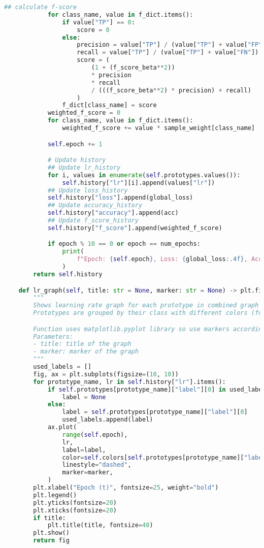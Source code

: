 \begin{lstlisting}[language=Python]
            ## calculate f-score
            for class_name, value in f_dict.items():
                if value["TP"] == 0:
                    score = 0
                else:
                    precision = value["TP"] / (value["TP"] + value["FP"])
                    recall = value["TP"] / (value["TP"] + value["FN"])
                    score = (
                        (1 + (f_score_beta**2))
                        * precision
                        * recall
                        / (((f_score_beta**2) * precision) + recall)
                    )
                f_dict[class_name] = score
            weighted_f_score = 0
            for class_name, value in f_dict.items():
                weighted_f_score += value * sample_weight[class_name]

            self.epoch += 1

            # Update history
            ## Update lr_history
            for i, values in enumerate(self.prototypes.values()):
                self.history["lr"][i].append(values["lr"])
            ## Update loss_history
            self.history["loss"].append(global_loss)
            ## Update accuracy_history
            self.history["accuracy"].append(acc)
            ## Update f_score_history
            self.history["f_score"].append(weighted_f_score)

            if epoch % 10 == 0 or epoch == num_epochs:
                print(
                    f"Epoch: {self.epoch}, Loss: {global_loss:.4f}, Accuracy: {acc*100:.2f} %, F_{f_name}_score: {weighted_f_score*100:.2f} %"
                )
        return self.history

    def lr_graph(self, title: str = None, marker: str = None) -> plt.figure:
        """
        Shows learning rate graph for each prototype in combined graph
        Prototypes are grouped by their class with different colors (for now max 3 colors)

        Function uses matplotlib.pyplot library so use markers according to matplotlib.pyplot library
        Parameters:
        - title: title of the graph
        - marker: marker of the graph
        """
        used_labels = []
        fig, ax = plt.subplots(figsize=(10, 10))
        for prototype_name, lr in self.history["lr"].items():
            if self.prototypes[prototype_name]["label"][0] in used_labels:
                label = None
            else:
                label = self.prototypes[prototype_name]["label"][0]
                used_labels.append(label)
            ax.plot(
                range(self.epoch),
                lr,
                label=label,
                color=self.colors[self.prototypes[prototype_name]["label"][0]],
                linestyle="dashed",
                marker=marker,
            )
        plt.xlabel("Epoch (t)", fontsize=25, weight="bold")
        plt.legend()
        plt.yticks(fontsize=20)
        plt.xticks(fontsize=20)
        if title:
            plt.title(title, fontsize=40)
        plt.show()
        return fig


\end{lstlisting}
